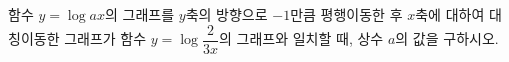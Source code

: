 함수 $y=\log ax$의 그래프를 $y$축의 방향으로 $-1$만큼 평행이동한 후 $x$축에 대하여 대칭이동한 그래프가 함수 $y=\log \dfrac{2}{3x}$의 그래프와 일치할 때, 상수 $a$의 값을 구하시오.
